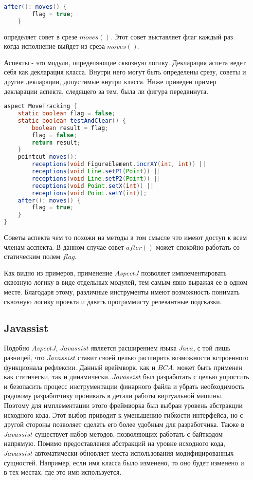 \begin{lstlisting}[language=Java, caption={Совет, отмечающий изменения точки $x$ или $y$.}]
    after(): moves() {
        flag = true;
    }
\end{lstlisting}

определяет совет в срезе $moves()$. Этот совет выставляет флаг каждый раз когда исполнение выйдет из среза $moves()$.

Аспекты - это модули, определяющие сквозную логику. Декларация аспета ведет себя как декларация класса. Внутри него могут быть определены срезу, советы и другие декларации, допустимые внутри класса. Ниже приведен пример декларации аспекта, следящего за тем, была ли фигура передвинута.

\begin{lstlisting}[language=Java, caption={Аспект, отслеживающий изменения фигур.}]
aspect MoveTracking {
    static boolean flag = false;
    static boolean testAndClear() {
        boolean result = flag;
        flag = false;
        return result;
    }
    pointcut moves():
        receptions(void FigureElement.incrXY(int, int)) ||
        receptions(void Line.setP1(Point)) ||
        receptions(void Line.setP2(Point)) ||
        receptions(void Point.setX(int)) ||
        receptions(void Point.setY(int));
    after(): moves() {
        flag = true;
    }
}
\end{lstlisting}


Советы аспекта чем то похожи на методы в том смысле что имеют доступ к всем членам асспекта. В данном случае совет $after()$ может спокойно работать со статическим полем $flag$.

Как видно из примеров, применение $AspectJ$ позволяет имплементировать сквозную логику в виде отдельных модулей, тем самым явно выражая ее в одном месте. Благодаря этому, различные инструменты имеют возможность понимать сквозную логику проекта и давать программисту релевантные подсказки.

\subsection{Javassist}

Подобно $AspectJ$, $Javassist$ является расширением языка $Java$, с той лишь разницей, что $Javassist$ ставит своей целью расширить возможности встроенного функционала рефлексии. Данный вреймворк, как и $BCA$, может быть применен как статически, так и динамически. $Javassist$ был разработать с целью упростить и безопасить процесс инструментации финарного файла и убрать необходимость рядовому разработчику проникать в детали работы виртуальной машины. Поэтому для имплементации этого фреймворка был выбран уровень абстракции исходного кода. Этот выбор приводит к уменьшению гибкости интерфейса, но с другой стороны позволяет сделать его более удобным для разработчика. Также в $Javassist$ существует набор методов, позволяющих работать с байткодом напрямую. Помимо предоставления абстракций на уровне исходного кода, $Javassist$ автоматически обновляет места использования модифицированных сущностей. Например, если имя класса было изменено, то оно будет изменено и в тех местах, где это имя используется.

